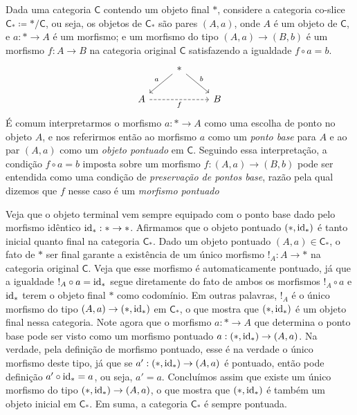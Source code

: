 \begin{exem}
  \label{exem:categoria_objetos_pontuados}
  Dada uma categoria $\mathsf{C}$ contendo um objeto final $*$, considere a categoria co-slice $\mathsf{C}_{*} \coloneqq * / \mathsf{C}$, ou seja, os objetos de $\mathsf{C}_{*}$ são pares $(A,a)$, onde $A$ é um objeto de $\mathsf{C}$, e $a: * \to A$ é um morfismo; e um morfismo do tipo $(A,a) \to (B,b)$ é um morfismo $f: A \to B$ na categoria original $\mathsf{C}$ satisfazendo a igualdade $f \circ a = b$.
  \begin{displaymath}
    \begin{tikzcd}
      & *
      \arrow[ld, "a" swap]
      \arrow[rd, "b"]
      \\ A
      \arrow[rr, dashed, "f" swap]
      & & B
    \end{tikzcd}
  \end{displaymath}
  É comum interpretarmos o morfismo $a: * \to A$ como uma escolha de ponto no objeto $A$, e nos referirmos então ao morfismo $a$ como um \emph{ponto base} para $A$ e ao par $(A,a)$ como um \emph{objeto pontuado} em $\mathsf{C}$.
  Seguindo essa interpretação, a condição $f \circ a = b$ imposta sobre um morfismo $f: (A,a) \to (B,b)$ pode ser entendida como uma condição de \emph{preservação de pontos base}, razão pela qual dizemos que $f$ nesse caso é um \emph{morfismo pontuado}

  Veja que o objeto terminal vem sempre equipado com o ponto base dado pelo morfismo idêntico $\mathrm{id}_{*}: * \to *$.
  Afirmamos que o objeto pontuado $(*,\mathrm{id}_{*})$ é tanto inicial quanto final na categoria $\mathsf{C}_{*}$.
  Dado um objeto pontuado $(A,a) \in \mathsf{C}_{*}$, o fato de $*$ ser final garante a existência de um único morfismo $!_{A}: A \to *$ na categoria original $\mathsf{C}$.
  Veja que esse morfismo é automaticamente pontuado, já que a igualdade $!_{A} \circ a = \mathrm{id}_{*}$ segue diretamente do fato de ambos os morfismos $!_{A} \circ a$ e $\mathrm{id}_{*}$ terem o objeto final $*$ como codomínio.
  Em outras palavras, $!_{A}$ é o único morfismo do tipo $(A,a) \to (*,\mathrm{id}_{*})$ em $\mathsf{C}_{*}$, o que mostra que $(*,\mathrm{id}_{*})$ é um objeto final nessa categoria.
  Note agora que o morfismo $a: * \to A$ que determina o ponto base pode ser visto como um morfismo pontuado $a: (*,\mathrm{id}_{*}) \to (A,a)$.
  Na verdade, pela definição de morfismo pontuado, esse é na verdade o único morfismo deste tipo, já que se $a': (*,\mathrm{id}_{*}) \to (A,a)$ é pontuado, então pode definição $a' \circ \mathrm{id}_{*} = a$, ou seja, $a' = a$.
  Concluímos assim que existe um único morfismo do tipo $(*,\mathrm{id}_{*}) \to (A,a)$, o que mostra que $(*,\mathrm{id}_{*})$ é também um objeto inicial em $\mathsf{C}_{*}$.
  Em suma, a categoria $\mathsf{C}_{*}$ é sempre pontuada.
\end{exem}

